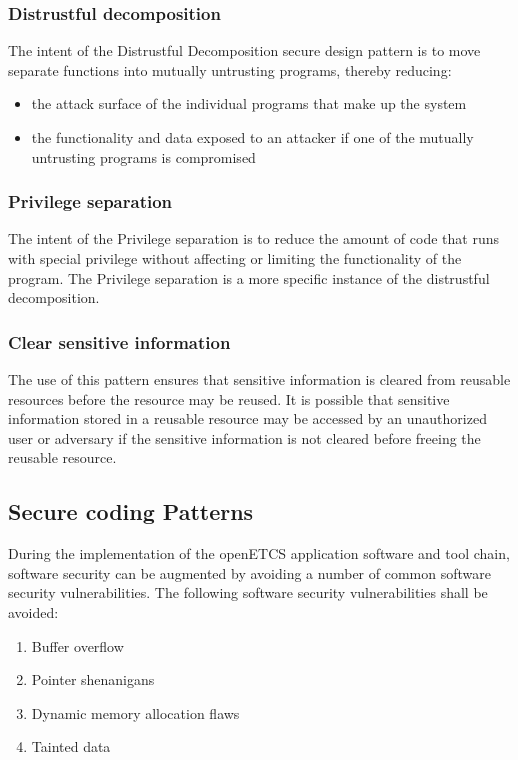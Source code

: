 \documentclass{template/openetcs_report}
\begin{document}
\subsubsection{Distrustful decomposition}
The intent of the Distrustful Decomposition secure design pattern is to move separate functions into mutually untrusting programs, thereby reducing:
\begin{itemize}
  \item the attack surface of the individual programs that make up the system
  \item the functionality and data exposed to an attacker if one of the mutually untrusting programs is compromised
\end{itemize}

\subsubsection{Privilege separation}
The intent of the Privilege separation is to reduce the amount of code that runs with special privilege without affecting or limiting the functionality of the program. The Privilege separation is a more specific instance of the distrustful decomposition.

\subsubsection{Clear sensitive information}
The use of this pattern ensures that sensitive information is cleared from reusable resources before the resource may be reused. It is possible that sensitive information stored in a reusable resource may be accessed by an unauthorized user or adversary if the sensitive information is not cleared before freeing the reusable resource.


\subsection{Secure coding Patterns}
\label{CPatterns1}
During the implementation of the openETCS application software and tool chain, software security can be augmented by avoiding a number of common software security vulnerabilities. 
The following software security vulnerabilities shall be avoided:
\begin{enumerate}
  \item Buffer overflow
  \item Pointer shenanigans
  \item Dynamic memory allocation flaws
  \item Tainted data
\end{enumerate}
\end{document}
